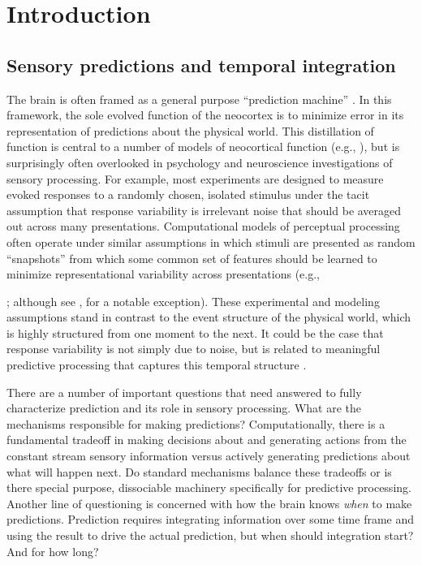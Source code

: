 \documentclass[dwyatte_dissertation.tex]{subfiles}
\begin{document}
\sloppy

\chapter{Introduction}
\label{chap:intro}

\section{Sensory predictions and temporal integration}
The brain is often framed as a general purpose ``prediction machine'' \cite{HawkinsBlakeslee04,Clark13}. In this framework, the sole evolved function of the neocortex is to minimize error in its representation of predictions about the physical world. This distillation of function is central to a number of models of neocortical function (e.g., ), but is surprisingly often overlooked in psychology and neuroscience investigations of sensory processing. For example, most experiments are designed to measure evoked responses to a randomly chosen, isolated stimulus under the tacit assumption that response variability is irrelevant noise that should be averaged out across many presentations. Computational models of perceptual processing often operate under similar assumptions in which stimuli are presented as random ``snapshots'' from which some common set of features should be learned to minimize representational variability across presentations (e.g., {; although see , for a notable exception). These experimental and modeling assumptions stand in contrast to the event structure of the physical world, which is highly structured from one moment to the next. It could be the case that response variability is not simply due to noise, but is related to meaningful predictive processing that captures this temporal structure \cite{ArieliSterkinGrinvaldEtAl96,WilderJonesAhmedEtAl13,FischerWhitney14}.

There are a number of important questions that need answered to fully characterize prediction and its role in sensory processing. What are the mechanisms responsible for making predictions? Computationally, there is a fundamental tradeoff in making decisions about and generating actions from the constant stream sensory information versus actively generating predictions about what will happen next. Do standard mechanisms balance these tradeoffs or is there special purpose, dissociable machinery specifically for predictive processing. Another line of questioning is concerned with how the brain knows \textit{when} to make predictions. Prediction requires integrating information over some time frame and using the result to drive the actual prediction, but when should integration start? And for how long? 

}
\end{document}
